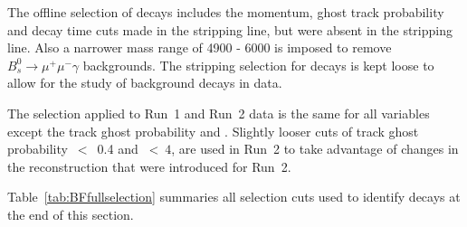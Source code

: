 The offline selection of \bmumu decays includes the momentum, ghost track probability and decay time cuts made in the \bhh stripping line, but were absent in the \bmumu stripping line. Also a narrower mass range of 4900 - 6000 \mevcc is imposed to remove $B_{s}^{0} \to \mu^{+} \mu^{-} \gamma$ backgrounds. The stripping selection for \bmumu decays is kept loose to allow for the study of background decays in data. 

The selection applied to Run~1 and Run~2 data is the same for all variables except the track ghost probability and \chitrk. Slightly looser cuts of track ghost probability~$<$~0.4 and \chitrk~<~$4$, are used in Run~2 to take advantage of changes in the reconstruction that were introduced for Run~2. 

Table~\ref{tab:BFfullselection} summaries all selection cuts used to identify \bmumu %
decays at the end of this section.


